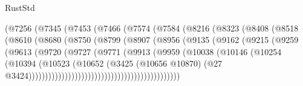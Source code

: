 \begin{lexlean}{RustStd}
\begin{coremodule}
                            (@7256
                              (@7345
                                (@7453
                                  (@7466
                                    (@7574
                                      (@7584
                                        (@8216
                                          (@8323
                                            (@8408
                                              (@8518
                                                (@8610
                                                  (@8680
                                                    (@8750
                                                      (@8799
                                                        (@8907
                                                          (@8956
                                                            (@9135
                                                              (@9162
                                                                (@9215
                                                                  (@9259
                                                                    (@9613
                                                                      (@9720
                                                                        (@9727
                                                                          (@9771
                                                                            (@9913
                                                                              (@9959
                                                                                (@10038
                                                                                  (@10146
                                                                                    (@10254
                                                                                      (@10394
                                                                                        (@10523
                                                                                          (@10652
                                                                                            (@3425
                                                                                              (@10656
                                                                                                @10870)
                                                                                              (@27
                                                                                                @3424))))))))))))))))))))))))))))))))))))))))))))))

\end{coremodule}
\end{lexlean}
